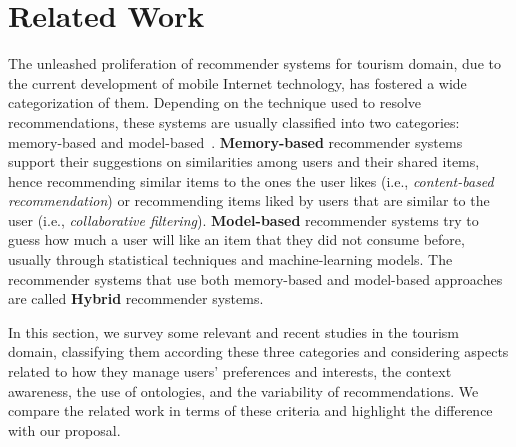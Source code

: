 \section{Related Work} \label{section:related-work}




The unleashed proliferation  of recommender systems for tourism domain, due to the current development of mobile Internet technology, has fostered a wide categorization of them. 
Depending on the technique used to resolve recommendations, these systems are usually classified into two categories: memory-based and model-based~\cite{bobadilla2013recommender,ebrahim_2012}. \textbf{Memory-based} recommender systems support their  suggestions on similarities among users and their shared items, hence recommending similar items to the ones the user likes (i.e., \textit{content-based recommendation}) or recommending items liked by users that are similar to the user (i.e., \textit{collaborative filtering}). \textbf{Model-based} recommender systems try to guess how much a user will like an item that they did not consume before, usually through statistical techniques and machine-learning models. The recommender systems that use both memory-based and model-based approaches are called \textbf{Hybrid} recommender systems.

In this section, we survey some relevant and recent studies in the tourism domain, classifying them according these three categories and considering aspects related to  how they manage users' preferences and interests, the context awareness, the use of ontologies, and the variability of recommendations. We compare the related work in terms of these criteria and highlight the difference with our proposal.    


